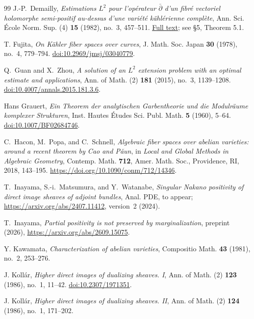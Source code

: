 \documentclass[11pt,reqno]{amsart}
\numberwithin{equation}{section}
\theoremstyle{definition}
\theoremstyle{remark}
\begin{document}
\begin{thebibliography}{99}
J.-P.~Demailly,
\emph{Estimations \(L^2\) pour l'op\'erateur \(\bar\partial\) d'un
fibr\'e vectoriel holomorphe semi-positif au-dessus d'une vari\'et\'e
k\"ahl\'erienne compl\`ete},
Ann. Sci. \'Ecole Norm. Sup. (4) \textbf{15} (1982), no.~3, 457--511.
\href{https://www.numdam.org/article/ASENS_1982_4_15_3_457_0.pdf}
{Full text}; see \S5, Theorem 5.1.

T. Fujita, \emph{On K\"ahler fiber spaces over curves}, J. Math. Soc. Japan \textbf{30} (1978), no.~4, 779--794. \href{https://doi.org/10.2969/jmsj/03040779}{doi:10.2969/jmsj/03040779}.

Q.~Guan and X.~Zhou,
\emph{A solution of an \(L^2\) extension problem with an optimal
estimate and applications},
Ann. of Math. (2) \textbf{181} (2015), no.~3, 1139--1208.
\href{https://doi.org/10.4007/annals.2015.181.3.6}
{doi:10.4007/annals.2015.181.3.6}.

Hans Grauert, \emph{Ein Theorem der analytischen Garbentheorie und die Modulr\"aume komplexer Strukturen}, Inst. Hautes \'{E}tudes Sci. Publ. Math. \textbf{5} (1960), 5--64. \href{https://doi.org/10.1007/BF02684746}{doi:10.1007/BF02684746}.

C.~Hacon, M.~Popa, and C.~Schnell,
\emph{Algebraic fiber spaces over abelian varieties: around a recent
theorem by Cao and P\u aun},
in \emph{Local and Global Methods in Algebraic Geometry},
Contemp. Math. \textbf{712}, Amer. Math. Soc., Providence, RI, 2018,
143--195.
\url{https://doi.org/10.1090/conm/712/14346}.

T.~Inayama, S.-i.~Matsumura, and Y.~Watanabe,
\emph{Singular Nakano positivity of direct image sheaves of adjoint bundles},
Anal. PDE, to appear;
\url{https://arxiv.org/abs/2407.11412}, version~2 (2024).

T.~Inayama,
\emph{Partial positivity is not preserved by marginalization},
preprint (2026),
\url{https://arxiv.org/abs/2609.15075}.

Y. Kawamata, \emph{Characterization of abelian varieties}, Compositio Math. \textbf{43} (1981), no.~2, 253--276.

J. Koll\'ar, \emph{Higher direct images of dualizing sheaves. I}, Ann. of Math. (2) \textbf{123} (1986), no.~1, 11--42. \href{https://doi.org/10.2307/1971351}{doi:10.2307/1971351}.

J. Koll\'ar, \emph{Higher direct images of dualizing sheaves. II}, Ann. of Math. (2) \textbf{124} (1986), no.~1, 171--202.


\end{thebibliography}
\end{document}
